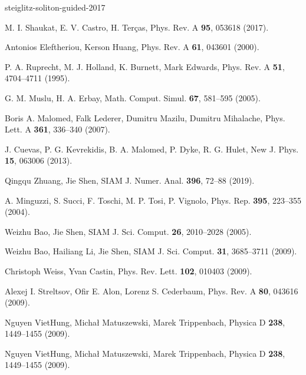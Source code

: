 \begin{thebibliography}{99}
steiglitz-soliton-guided-2017

M. I. Shaukat, E. V. Castro, H. Terças,  Phys. Rev. A \textbf{95}, 053618  (2017).

Antonios Eleftheriou, Kerson Huang,  Phys. Rev. A \textbf{61}, 043601  (2000).

P. A. Ruprecht, M. J. Holland, K. Burnett, Mark Edwards,  Phys. Rev. A \textbf{51}, 4704--4711  (1995).

G. M. Muslu, H. A. Erbay,  Math. Comput. Simul. \textbf{67}, 581--595  (2005).

Boris A. Malomed, Falk Lederer, Dumitru Mazilu, Dumitru Mihalache,  Phys. Lett. A \textbf{361}, 336--340  (2007).

J. Cuevas, P. G. Kevrekidis, B. A. Malomed, P. Dyke, R. G. Hulet,  New J. Phys. \textbf{15}, 063006  (2013).

Qingqu Zhuang, Jie Shen,  SIAM J. Numer. Anal. \textbf{396}, 72--88  (2019).

A. Minguzzi, S. Succi, F. Toschi, M. P. Tosi, P. Vignolo,  Phys. Rep. \textbf{395}, 223--355  (2004).

Weizhu Bao, Jie Shen,  SIAM J. Sci. Comput. \textbf{26}, 2010--2028  (2005).

Weizhu Bao, Hailiang Li, Jie Shen,  SIAM J. Sci. Comput. \textbf{31}, 3685--3711  (2009).

Christoph Weiss, Yvan Castin,  Phys. Rev. Lett. \textbf{102}, 010403  (2009).

Alexej I. Streltsov, Ofir E. Alon, Lorenz S. Cederbaum,  Phys. Rev. A \textbf{80}, 043616  (2009).

Nguyen VietHung, Michał Matuszewski, Marek Trippenbach,  Physica D \textbf{238}, 1449--1455  (2009).

Nguyen VietHung, Michał Matuszewski, Marek Trippenbach,  Physica D \textbf{238}, 1449--1455  (2009).


\end{thebibliography}
